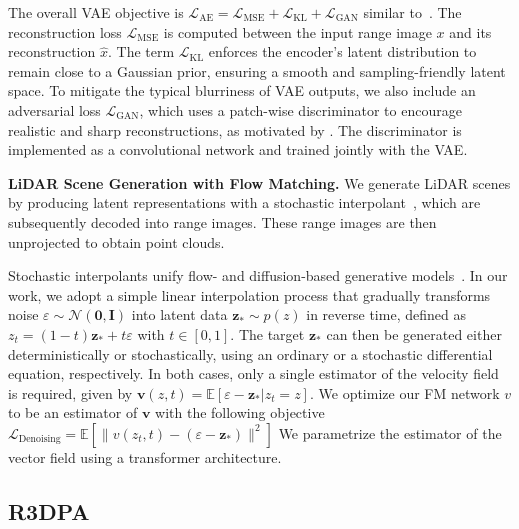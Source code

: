 The overall VAE objective is $\mathcal{L}_{\text{AE}} = \mathcal{L}_{\text{MSE}} + \mathcal{L}_{\text{KL}} + \mathcal{L}_{\text{GAN}}$ similar to~\cite{rombach_high-resolution_2022}.  The reconstruction loss $\mathcal{L}_{\text{MSE}}$ is computed between the input range image $x$ and its reconstruction $\hat{x}$. The term $\mathcal{L}_{\text{KL}}$ enforces the encoder's latent distribution to remain close to a Gaussian prior, ensuring a smooth and sampling-friendly latent space. To mitigate the typical blurriness of VAE outputs, we also include an adversarial loss $\mathcal{L}_{\text{GAN}}$, which uses a patch-wise discriminator to encourage realistic and sharp reconstructions, as motivated by \cite{nakashima_fast_2025}. The discriminator is implemented as a convolutional network and trained jointly with the VAE.  


\textbf{LiDAR Scene Generation with Flow Matching.}
We generate LiDAR scenes by producing latent representations with a stochastic interpolant~\cite{ma_sit_2024}, which are subsequently decoded into range images. These range images are then unprojected to obtain point clouds.


Stochastic interpolants unify flow- and diffusion-based generative models~\cite{albergo2023stochastic}. In our work, we adopt a simple linear interpolation process that gradually transforms noise $\varepsilon\sim\mathcal{N}(\mathbf{0},\mathbf{I})$ into latent data $\mathbf{z}_*\sim p(z)$ in reverse time, defined as $z_t = (1-t)\mathbf{z}_*+t\varepsilon$ with $ t\in[0,1]$. The target $\mathbf{z}_*$ can then be generated either deterministically or stochastically, using an ordinary or a stochastic differential equation, respectively. In both cases, only a single estimator of the velocity field is required, given by $ \mathbf{v}(z,t) = \mathbb{E}[\varepsilon-\mathbf{z}_*|z_t=z]$. We optimize our FM network $v$ to be an estimator of $\mathbf{v}$ with the following objective $\mathcal{L}_{\text{Denoising}} = \mathbb{E}[\|v(z_t,t)-(\varepsilon - \mathbf{z}_*)\|^2]$
We parametrize the estimator of the vector field using a transformer architecture. 
 
\subsection{R3DPA}

